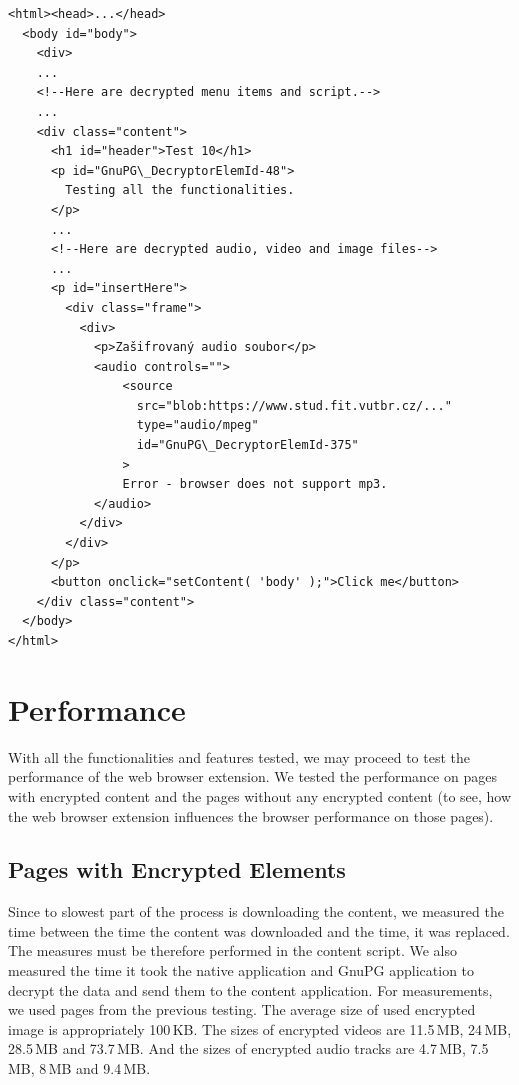 \begin{Verbatim}[commandchars=\\\{\},codes={\catcode`$=3\catcode`_=8},samepage=false,frame=single]
<html><head>...</head>
  <body id="body">
    <div>
    ...
    <!--Here are decrypted menu items and script.-->
    ...
    <div class="content">
      <h1 id="header">Test 10</h1>
      <p id="GnuPG\_DecryptorElemId-48">
        Testing all the functionalities.
      </p>
      ...
      <!--Here are decrypted audio, video and image files-->
      ...
      <p id="insertHere">
        <div class="frame">
          <div>
            <p>Zašifrovaný audio soubor</p>
            <audio controls="">
                <source
                  src="blob:https://www.stud.fit.vutbr.cz/..."
                  type="audio/mpeg"
                  id="GnuPG\_DecryptorElemId-375"
                >
                Error - browser does not support mp3.
            </audio>
          </div>
        </div>
      </p>
      <button onclick="setContent( 'body' );">Click me</button>
    </div class="content">
  </body>
</html>
\end{Verbatim}

\section{Performance}
\label{test:performance}
With all the functionalities and features tested, we may proceed to test the performance of the web browser extension. We tested the performance on pages with encrypted content and the pages without any encrypted content (to see, how the web browser extension influences the browser performance on those pages).

\subsection{Pages with Encrypted Elements}
Since to slowest part of the process is downloading the content, we measured the time between the time the content was downloaded and the time, it was replaced. The measures must be therefore performed in the content script. We also measured the time it took the native application and GnuPG application to decrypt the data and send them to the content application. For measurements, we used pages from the previous testing. The average size of used encrypted image is appropriately 100\,KB. The sizes of encrypted videos are 11.5\,MB, 24\,MB, 28.5\,MB and 73.7\,MB. And the sizes of encrypted audio tracks are 4.7\,MB, 7.5\,MB, 8\,MB and 9.4\,MB.


